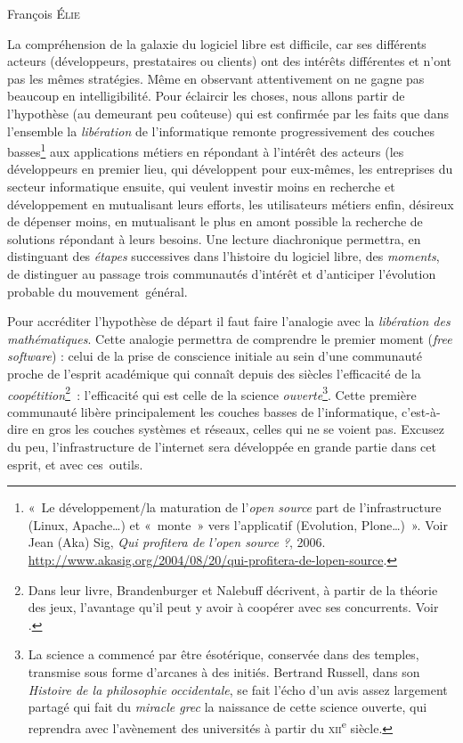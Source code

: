 \documentclass{FramateX}
\begin{document}
\begin{refsection}

\begin{flushright}
François \textsc{Élie}
\end{flushright}
\vspace{10 mm}

La compréhension de la galaxie du logiciel libre est difficile, car ses
différents acteurs (développeurs, prestataires ou clients) ont des
intérêts différentes et n'ont pas les mêmes stratégies. Même en
observant attentivement on ne gagne pas beaucoup en intelligibilité.
Pour éclaircir les choses, nous allons partir de l'hypothèse (au
demeurant peu coûteuse) qui est confirmée par les faits que dans
l'ensemble la \textit{libération} de l'informatique remonte
progressivement des couches basses\footnote{«~Le développement/la
maturation de l'\textit{open source} part de l'infrastructure (Linux,
Apache…) et «~monte~» vers l'applicatif (Evolution, Plone…)~». Voir Jean (Aka) Sig,
\textit{Qui profitera de l'open source ?}, 2006. \url{http://www.akasig.org/2004/08/20/qui-profitera-de-lopen-source}.}
aux applications métiers en répondant à l'intérêt des acteurs (les
développeurs en premier lieu, qui développent pour eux-mêmes, les
entreprises du secteur informatique ensuite, qui veulent investir moins
en recherche et développement en mutualisant leurs efforts, les
utilisateurs métiers enfin, désireux de dépenser moins, en mutualisant
le plus en amont possible la recherche de solutions répondant à leurs
besoins. Une lecture diachronique permettra, en distinguant des
\textit{étapes} successives dans l'histoire du logiciel libre, des
\textit{moments}, de distinguer au passage trois communautés d'intérêt
et d'anticiper l'évolution probable du mouvement~général. 

Pour accréditer l'hypothèse de départ il faut faire l'analogie avec la
\textit{libération des mathématiques}. Cette analogie permettra de
comprendre le premier moment (\textit{free software}) : celui de la
prise de conscience initiale au sein d'une communauté proche de
l'esprit académique qui connaît depuis des siècles l'efficacité de la
\textit{coopétition}\footnote{Dans leur livre, Brandenburger et Nalebuff décrivent, à partir de la théorie
des jeux, l'avantage qu'il peut y avoir à coopérer avec ses
concurrents. Voir \cite{Brandenburger1997}.}\textit{~}: l'efficacité qui est celle de la science
\textit{ouverte}\footnote{La science a commencé par être ésotérique,
conservée dans des temples, transmise sous forme d'arcanes à des
initiés. Bertrand Russell, dans son \textit{Histoire de la philosophie
occidentale}, se fait l'écho d'un avis assez largement partagé qui fait
du \textit{miracle grec} la naissance de cette science ouverte, qui
reprendra avec l'avènement des universités à partir du
\textsc{xii}\textsuperscript{e} siècle.}. Cette première communauté
libère principalement les couches basses de l'informatique,
c'est-à-dire en gros les couches systèmes et réseaux, celles qui ne se
voient pas. Excusez du peu, l'infrastructure de l'internet sera
développée en grande partie dans cet esprit, et avec ces~outils. 


\end{refsection}
\end{document}
